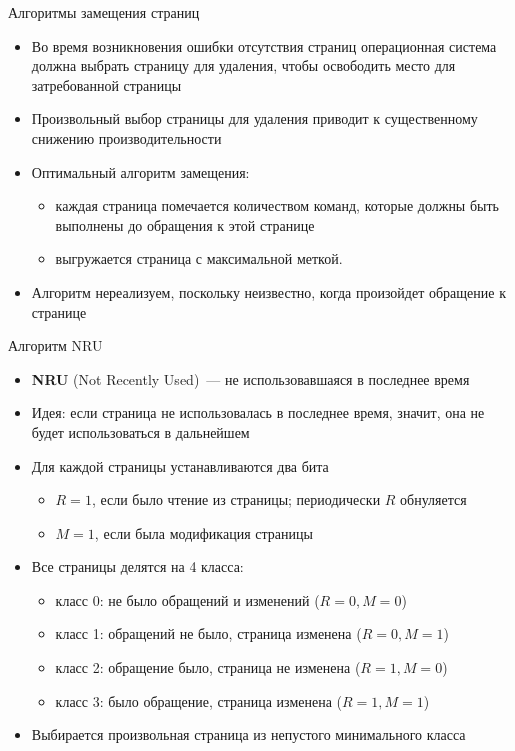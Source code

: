 \documentclass[aspectratio=169,14pt]{beamer}
\begin{document}
\begin{frame}{Алгоритмы замещения страниц}
    \begin{itemize}
        \item Во время возникновения ошибки отсутствия страниц операционная
        система должна выбрать страницу для удаления, чтобы освободить место
        для затребованной страницы
        \item Произвольный выбор страницы для удаления приводит к
        существенному снижению производительности
        \item Оптимальный алгоритм замещения:
        \begin{itemize}
            \item каждая страница помечается количеством команд, которые
            должны быть выполнены до обращения к этой странице
            \item выгружается страница с максимальной меткой.
        \end{itemize}
        \item Алгоритм нереализуем, поскольку неизвестно, когда произойдет
        обращение к странице
    \end{itemize}
\end{frame}

\begin{frame}{Алгоритм NRU}
    \begin{spacing}{0.9}
    \begin{itemize}
        \item \textbf{NRU} (Not Recently Used)~--- не использовавшаяся в
        последнее время
        \item Идея: если страница не использовалась в последнее время,
        значит, она не будет использоваться в дальнейшем
        \item Для каждой страницы устанавливаются два бита
        \begin{itemize}
            \item $R = 1$, если было чтение из страницы; периодически $R$
            обнуляется
            \item $M = 1$, если была модификация страницы
        \end{itemize}
        \item Все страницы делятся на 4 класса:
        \begin{itemize}
            \item класс 0: не было обращений и изменений ($R=0, M=0$)
            \item класс 1: обращений не было, страница изменена ($R=0, M=1$)
            \item класс 2: обращение было, страница не изменена ($R=1, M=0$)
            \item класс 3: было обращение, страница изменена ($R=1, M=1$)
        \end{itemize}
        \item Выбирается произвольная страница из непустого минимального
        класса
    \end{itemize}
    \end{spacing}
\end{frame}
\end{document}
